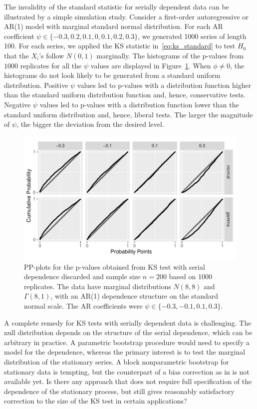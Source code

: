 \documentclass[12pt, letterpaper, titlepage]{article}
\begin{document}
The invalidity of the standard statistic for serially dependent data can be
illustrated by a simple simulation study. Consider a first-order autoregressive
or AR(1) model with marginal standard normal distribution. For each AR
coefficient $\psi \in \{-0.3, 0.2, 0.1, 0, 0.1, 0.2, 0.3\}$, we generated 1000
series of length 100. For each series, we applied the KS statistic
in~\eqref{eq:ks_standard} to test $H_0$ that the $X_i$'s follow $N(0, 1)$
marginally. The histograms of the p-values from $1000$ replicates for all the
$\psi$ values are displayed in Figure~\ref{fig:pp_s}. When
$\phi \ne 0$, the histograms do not look likely to be generated from a standard
uniform distribution. Positive $\psi$ values led to p-values with a distribution
function higher than the standard uniform distribution function and, hence,
conservative tests. Negative $\psi$ values led to p-values with a distribution
function lower than the standard uniform distribution and, hence, liberal
tests. The larger the magnitude of
$\psi$, the bigger the deviation from the desired level.

\begin{figure}[tbp]
  \centering
  \includegraphics[width=\textwidth]{pp_s.pdf}
  \caption{PP-plots for the p-values obtained from KS test with serial
    dependence discarded and sample size $n = 200$ based on 1000
    replicates. The data have marginal distributions $N(8, 8)$ and
    $\Gamma(8, 1)$, with an AR(1) dependence structure on the standard normal
    scale. The AR coefficients were $\psi \in \{-0.3, -0.1,  0.1,  0.3\}$.
  }
  \label{fig:pp_s}
\end{figure}


A complete remedy for KS tests with serially dependent data is
challenging. The null distribution depends on the structure of the serial
dependence, which can be arbitrary in practice. A parametric bootstrap procedure
would need to specify a model for the dependence, whereas the primary interest
is to test the marginal distribution of the stationary series. A block
nonparametric bootstrap for stationary data \citep{kunsch1989jackknife} is
tempting, but the counterpart of a bias correction as in
\citet{babu2004goodness} is not available yet. Is there any approach that does
not require full specification of the dependence of the stationary process,
but still gives reasonably satisfactory correction to the size of the KS test in
certain applications?
\end{document}
